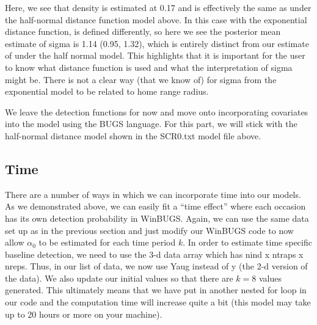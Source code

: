 Here, we see that density is estimated at 0.17 and is effectively the
same as under the half-normal distance function model above.  In this
case with the exponential distance function, \sigma is defined
differently, so here we see the posterior mean estimate of sigma is
1.14 (0.95, 1.32), which is entirely distinct from our estimate of \sigma under the half normal model.  This highlights that it is important for the user to know what distance function is used and what the interpretation of sigma might be.  There is not a clear way (that we know of) for sigma from the exponential model to be related to home range radius.   

We leave the detection functions for now and move onto incorporating covariates into the model using the BUGS language.  For this part, we will stick with the half-normal distance model shown in the SCR0.txt model file above. 

\subsection{Time}


There are a number of ways in which we can incorporate time into our models.  As we demonstrated above, we can easily fit a ``time effect'' where each occasion has its own detection probability in WinBUGS. Again, we can use the same data set up as in the previous section and just modify our WinBUGS code to now allow $\alpha_0$ to be estimated for each time period $k$.  In order to estimate time specific baseline detection, we need to use the 3-d data array which has nind x ntraps x nreps.  Thus, in our list of data, we now use Yaug instead of y (the 2-d version of the data).  We also update our initial values so that there are $k=8$ values generated. This ultimately means that we have put in another nested for loop in our code and the computation time will increase quite a bit (this model may take up to 20 hours or more on your machine).   

